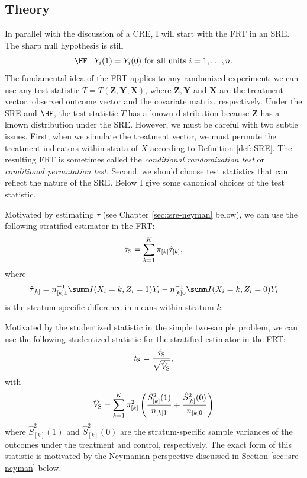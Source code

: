 \subsection{Theory}
In parallel with the discussion of a CRE, I will start with the FRT in an SRE. The sharp null hypothesis is still 
$$
\HF: Y_i(1) = Y_i(0) \text{ for all units } i=1, \ldots, n.
$$
The fundamental idea of the FRT applies to any randomized experiment: we can use any test statistic $T = T(\bm{Z}, \bm{Y}, \bm{X})$, where $\bm{Z}, \bm{Y}$ and $\bm{X}$ are the treatment vector, observed outcome vector and the covariate matrix, respectively. Under the SRE and $\HF$,  the test statistic $T$ has a known distribution because $\bm{Z}$ has a known distribution under the SRE. However, we must be careful with two subtle issues. First, when we simulate the treatment vector, we must permute the treatment indicators within strata of $X$ according to Definition \ref{def::SRE}. The resulting FRT is sometimes called the {\it conditional randomization test} or {\it  conditional permutation test}. Second, we should choose test statistics that can reflect the nature of the SRE. Below I give some canonical choices of the test statistic.

\begin{example}
\label{eg::stratifiedestimator}
Motivated by estimating $\tau$ (see Chapter \ref{sec::sre-neyman} below), we can use the following stratified estimator in the FRT:
$$
\hat{\tau}_\textsc{S} = \sum_{k=1}^K  \pi_{[k]} \hat{\tau}_{[k]},
$$
where 
$$
\hat{\tau}_{[k]} = n_{[k]1}^{-1} \sumn I(X_i  =k, Z_i=1) Y_i - n_{[k]0}^{-1} \sumn I(X_i  =k, Z_i=0) Y_i 
$$
is the stratum-specific difference-in-means within stratum $k$. 
\end{example}




\begin{example}
\label{eg::student-stratifiedestimator}
Motivated by the studentized statistic in the simple two-sample problem, we can use the following studentized statistic for the stratified estimator in the FRT:
$$
t_\textsc{S} = 
\frac{ \hat{\tau}_\textsc{S}  }{  \sqrt{\hat{V}_\textsc{S}  }},
$$
with 
$$
\hat{V}_\textsc{S} = \sum_{k=1}^K  \pi_{[k]}^2 \left(  \frac{\hat{S}_{[k]}^2(1)}{ n_{[k]1} } +  \frac{ \hat{S}_{[k]}^2(0)}{ n_{[k]0} } \right)
$$
where $\hat{S}_{[k]}^2(1)$ and $\hat{S}_{[k]}^2(0)$ are the stratum-specific sample variances of the outcomes under the treatment and control, respectively. The exact form of this statistic is motivated by the Neymanian perspective discussed in Section \ref{sec::sre-neyman} below.
\end{example}




